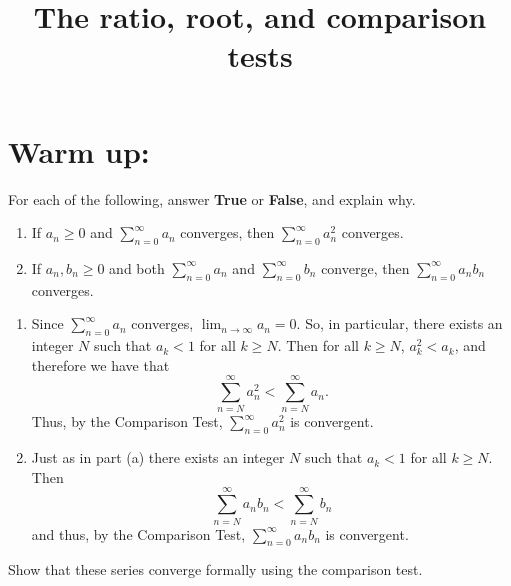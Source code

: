 \documentclass[]{ximera}
\title{The ratio, root, and comparison tests}
\begin{document}
\begin{abstract}		\end{abstract}
\maketitle



\section{Warm up:}
For each of the following, answer {\bf True} or {\bf False}, and explain why.
	\begin{enumerate}
	
	\item  If $a_n \geq 0$ and $\sum_{n=0}^\infty a_n$ converges, then $\sum_{n=0}^\infty a_n^2$ converges.
	
	\item  If $a_n, b_n \geq 0$ and both $\sum_{n=0}^\infty a_n$ and $\sum_{n=0}^\infty b_n$ converge, then $\sum_{n=0}^\infty a_n b_n$ converges.
	
	\end{enumerate}
	
	\begin{freeResponse}
		\begin{enumerate}
		
		\item  {}
		
		Since $\sum_{n=0}^\infty a_n$ converges, $\lim_{n \to \infty} a_n = 0$.  
		So, in particular, there exists an integer $N$ such that $a_k < 1$ for all $k \geq N$.  
		Then for all $k \geq N$, $a_k^2 < a_k$, and therefore we have that
			\[
			\sum_{n=N}^\infty a_n^2 < \sum_{n=N}^\infty a_n.
			\]
		Thus,  by the Comparison Test, $\sum_{n=0}^\infty a_n^2$ is convergent.
		
		
		
		\item  {}
		
		Just as in part (a) there exists an integer $N$ such that $a_k < 1$ for all $k \geq N$.  
		Then
			\[
			\sum_{n=N}^\infty a_n b_n < \sum_{n=N}^\infty b_n
			\]
		and thus, by the Comparison Test, $\sum_{n=0}^\infty a_n b_n$ is convergent.
		
		\end{enumerate}
	\end{freeResponse}
	
\begin{instructorNotes}
Show that these series converge formally using the comparison test.
\end{instructorNotes}
\end{document}

